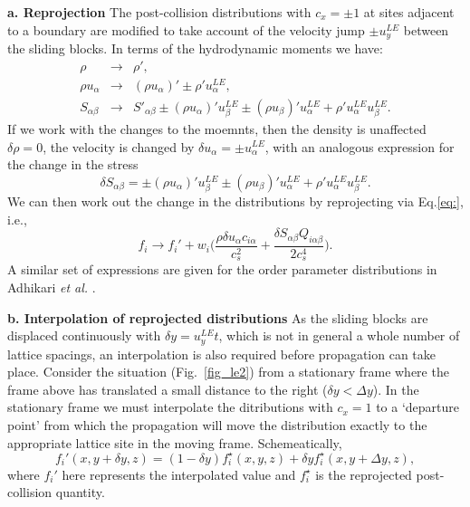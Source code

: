 \textbf{a. Reprojection} The post-collision distributions with
$c_x = \pm 1$ at sites adjacent to a boundary are modified to
take account of the velocity jump $\pm u^{LE}_y$ between the sliding
blocks. In terms of the hydrodynamic moments we have:
\begin{eqnarray}
\rho &\rightarrow& \rho', \\
\rho u_\alpha &\rightarrow& (\rho u_\alpha)' \pm \rho' u^{LE}_\alpha, \\
S_{\alpha\beta} &\rightarrow&
S'_{\alpha\beta} \pm (\rho u_\alpha)' u^{LE}_\beta
\pm (\rho u_\beta)' u^{LE}_\alpha + \rho' u^{LE}_\alpha u^{LE}_\beta.
\end{eqnarray}
If we work with the changes to the moemnts, then the density is
unaffected $\delta\rho =  0$, the velocity is changed by
$\delta u_\alpha = \pm u^{LE}_\alpha$, with an analogous expression for
the change in the stress
\begin{equation}
\delta S_{\alpha\beta} =
\pm (\rho u_\alpha)' u^{LE}_\beta
\pm (\rho u_\beta)' u^{LE}_\alpha + \rho' u^{LE}_\alpha u^{LE}_\beta.
\end{equation}
We can then work out the change in the distributions by reprojecting
via Eq.\ref{eq:}, i.e.,
\begin{equation}
f_i \rightarrow f_i' + w_i \Bigg(
\frac{\rho \delta u_\alpha c_{i\alpha}}{c_s^2} +
\frac{\delta S_{\alpha\beta}Q_{i\alpha\beta}}{2c_s^4} \Bigg).
\end{equation}
A similar set of expressions are given for the order parameter
distributions in Adhikari \textit{et al.} \cite{adhikari_desplat}.

\textbf{b. Interpolation of reprojected distributions}
As the sliding blocks are displaced continuously with
$\delta y = u_y^{LE}t$, which is not in general a whole number of
lattice spacings, an interpolation is also required before
propagation can take place. Consider the situation (Fig.~\ref{fig_le2}) from
a stationary frame where the frame above has translated a small
distance to the right ($\delta y < \Delta y$). In the stationary frame
we must interpolate the ditributions with $c_x = 1$ to a
`departure point' from which the propagation will move the
distribution exactly to the appropriate lattice site in the moving
frame. Schemeatically,
\begin{equation}
f_i'(x, y + \delta y, z) = 
 (1 - \delta y) f_i^\star(x, y, z) +
\delta y f_i^\star(x, y + \Delta y, z),
\end{equation}
where $f_i'$ here represents the interpolated value and $f_i^\star$
is the reprojected post-collision quantity.

